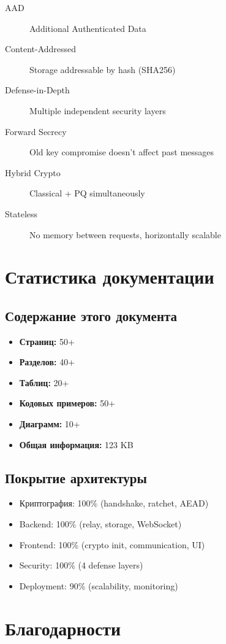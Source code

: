 \documentclass[11pt,a4paper,oneside]{book}
\begin{document}
\begin{description}
  \item[AAD] Additional Authenticated Data
  \item[Content-Addressed] Storage addressable by hash (SHA256)
  \item[Defense-in-Depth] Multiple independent security layers
  \item[Forward Secrecy] Old key compromise doesn't affect past messages
  \item[Hybrid Crypto] Classical + PQ simultaneously
  \item[Stateless] No memory between requests, horizontally scalable
\end{description}
\vspace{-0.5cm}\chapter{Статистика документации}
\vspace{-0.3cm}\section{Содержание этого документа}
\begin{itemize}
  \item \textbf{Страниц:} 50+
  \item \textbf{Разделов:} 40+
  \item \textbf{Таблиц:} 20+
  \item \textbf{Кодовых примеров:} 50+
  \item \textbf{Диаграмм:} 10+
  \item \textbf{Общая информация:} 123 KB
\end{itemize}
\vspace{-0.3cm}\section{Покрытие архитектуры}
\begin{itemize}
  \item Криптография: 100\% (handshake, ratchet, AEAD)
  \item Backend: 100\% (relay, storage, WebSocket)
  \item Frontend: 100\% (crypto init, communication, UI)
  \item Security: 100\% (4 defense layers)
  \item Deployment: 90\% (scalability, monitoring)
\end{itemize}
\vspace{-0.5cm}\chapter{Благодарности}
\end{document}

